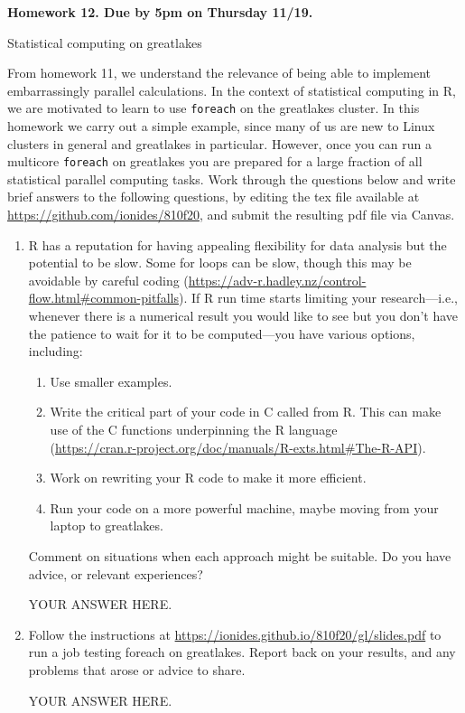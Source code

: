 \documentclass[12pt]{article}
\begin{document}
\begin{center}\bf
Homework 12. Due by 5pm on Thursday 11/19.

Statistical computing on greatlakes

\end{center}

From homework 11, we understand the relevance of being able to implement embarrassingly parallel calculations. In the context of statistical computing in R, we are motivated to learn to use \texttt{foreach} on the greatlakes cluster. In this homework we carry out a simple example, since many of us are new to Linux clusters in general and greatlakes in particular. However, once you can run a multicore \texttt{foreach} on greatlakes you are prepared for a large fraction of all statistical parallel computing tasks. Work through the questions below and write brief answers to the following questions, by editing the tex file available at \url{https://github.com/ionides/810f20}, and submit the resulting pdf file via Canvas. 

\begin{enumerate}

\item R has a reputation for having appealing flexibility for data analysis but the potential to be slow. Some for loops can be slow, though this may be avoidable by careful coding (\url{https://adv-r.hadley.nz/control-flow.html#common-pitfalls}). If R run time starts limiting your research---i.e., whenever there is a numerical result you would like to see but you don't have the patience to wait for it to be computed---you have various options, including:
  \begin{enumerate}
  \item Use smaller examples.
  \item Write the critical part of your code in C called from R. This can make use of the C functions underpinning the R language\\
(\url{https://cran.r-project.org/doc/manuals/R-exts.html#The-R-API}).
  \item Work on rewriting your R code to make it more efficient.
  \item Run your code on a more powerful machine, maybe moving from your laptop to greatlakes.
  \end{enumerate}
Comment on situations when each approach might be suitable. Do you have advice, or relevant experiences?
  
  YOUR ANSWER HERE.

\item Follow the instructions at \url{https://ionides.github.io/810f20/gl/slides.pdf} to run a job testing foreach on greatlakes. Report back on your results, and any problems that arose or advice to share.

YOUR ANSWER HERE.
  
\end{enumerate}
\end{document}
